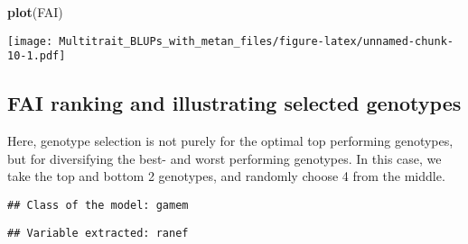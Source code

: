 \documentclass[
]{article}
\newenvironment{Shaded}{\begin{snugshade}}{\end{snugshade}}
\newcommand{\CommentTok}[1]{\textcolor[rgb]{0.56,0.35,0.01}{\textit{#1}}}
\newcommand{\FunctionTok}[1]{\textcolor[rgb]{0.13,0.29,0.53}{\textbf{#1}}}
\newcommand{\NormalTok}[1]{#1}
\newcommand{\OtherTok}[1]{\textcolor[rgb]{0.56,0.35,0.01}{#1}}
\newcommand{\SpecialCharTok}[1]{\textcolor[rgb]{0.81,0.36,0.00}{\textbf{#1}}}
\newcommand{\StringTok}[1]{\textcolor[rgb]{0.31,0.60,0.02}{#1}}
\begin{document}
\begin{Shaded}
\begin{Highlighting}[]
\FunctionTok{plot}\NormalTok{(FAI)}
\end{Highlighting}
\end{Shaded}

\texttt{[image: Multitrait\_BLUPs\_with\_metan\_files/figure-latex/unnamed-chunk-10-1.pdf]}

\subsection{FAI ranking and illustrating selected
genotypes}\label{fai-ranking-and-illustrating-selected-genotypes}

Here, genotype selection is not purely for the optimal top performing
genotypes, but for diversifying the best- and worst performing
genotypes. In this case, we take the top and bottom 2 genotypes, and
randomly choose 4 from the middle.

\begin{Shaded}
\end{Shaded}

\begin{verbatim}
## Class of the model: gamem
\end{verbatim}

\begin{verbatim}
## Variable extracted: ranef
\end{verbatim}
\end{document}
